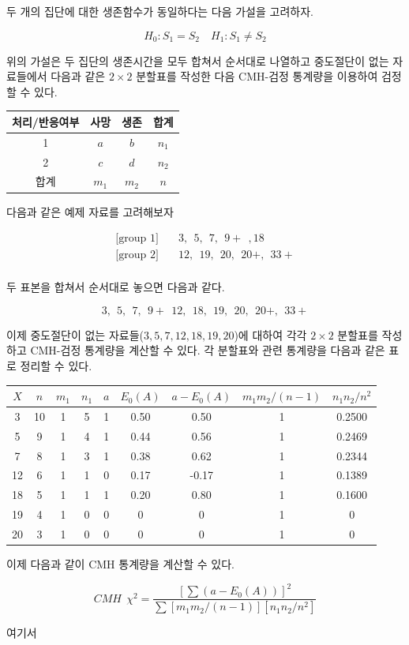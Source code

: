 \documentclass[
]{book}
\theoremstyle{definition}
\theoremstyle{definition}
\theoremstyle{definition}
\theoremstyle{definition}
\theoremstyle{remark}
\begin{document}
두 개의 집단에 대한 생존함수가 동일하다는 다음 가설을 고려하자.

\[ H_0: S_1 = S_2 \quad H_1: S_1 \ne S_2  \]

위의 가설은 두 집단의 생존시간을 모두 합쳐서 순서대로 나열하고 중도절단이 없는 자료들에서 다음과 같은 \(2\times 2\) 분할표를 작성한 다음 CMH-검정 통계량을 이용하여 검정할 수 있다.

\begin{longtable}[]{@{}cccc@{}}
\toprule
처리/반응여부 & 사망 & 생존 & 합계\tabularnewline
\midrule
\endhead
1 & \(a\) & \(b\) & \(n_1\)\tabularnewline
2 & \(c\) & \(d\) & \(n_2\)\tabularnewline
합계 & \(m_1\) & \(m_2\) & \(n\)\tabularnewline
\bottomrule
\end{longtable}

다음과 같은 예제 자료를 고려해보자

\begin{align*}
\text{[group 1]} \quad & 3,~~5,~~7,~~9+~~, 18 \\
\text{[group 2]} \quad & 12,~~ 19,~~ 20,~~ 20+,~~ 33+ \\
\end{align*}

두 표본을 합쳐서 순서대로 놓으면 다음과 같다.

\[ 3,~~5,~~7,~~9+~~12,~~ 18, ~~ 19,~~ 20,~~ 20+,~~ 33+  \]

이제 중도절단이 없는 자료들(\(3,5,7,12,18,19,20\))에 대하여 각각 \(2\times 2\) 분할표를 작성하고 CMH-검정 통계량을 계산할 수 있다. 각 분할표와 관련 통계량을 다음과 같은 표로 정리할 수 있다.

\begin{longtable}[]{@{}ccccccccc@{}}
\toprule
\(X\) & \(n\) & \(m_1\) & \(n_1\) & \(a\) & \(E_0(A)\) & \(a-E_0(A)\) & \(m_1 m_2/(n-1)\) & \(n_1 n_2 /n^2\)\tabularnewline
\midrule
\endhead
3 & 10 & 1 & 5 & 1 & 0.50 & 0.50 & 1 & 0.2500\tabularnewline
5 & 9 & 1 & 4 & 1 & 0.44 & 0.56 & 1 & 0.2469\tabularnewline
7 & 8 & 1 & 3 & 1 & 0.38 & 0.62 & 1 & 0.2344\tabularnewline
12 & 6 & 1 & 1 & 0 & 0.17 & -0.17 & 1 & 0.1389\tabularnewline
18 & 5 & 1 & 1 & 1 & 0.20 & 0.80 & 1 & 0.1600\tabularnewline
19 & 4 & 1 & 0 & 0 & 0 & 0 & 1 & 0\tabularnewline
20 & 3 & 1 & 0 & 0 & 0 & 0 & 1 & 0\tabularnewline
\bottomrule
\end{longtable}

이제 다음과 같이 CMH 통계량을 계산할 수 있다.

\[ CMH ~~\chi^2 = \frac {[ \sum (a-E_0(A))]^2}{ \sum [m_1 m_2/(n-1)][n_1 n_2 /n^2] }  \]

여기서
\end{document}

